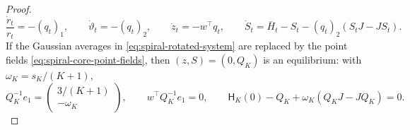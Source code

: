 \begin{proof}
\begin{equation}
        \frac{\dot r_t}{r_t}=-(q_t)_1,
        \qquad
        \dot\vartheta_t=-(q_t)_2,
        \qquad
        \dot z_t=-w^\top q_t,
        \qquad
        \dot S_t=\bar H_t-S_t-(q_t)_2(S_tJ-JS_t).
    \end{equation}
    If the Gaussian averages in \eqref{eq:spiral-rotated-system} are replaced by the point
    fields \eqref{eq:spiral-core-point-fields}, then $(z,S)=(0,Q_K)$ is an equilibrium: with
    $\omega_K=s_K/(K+1)$,
    \begin{equation*}
        Q_K^{-1}e_1=\begin{pmatrix}3/(K+1)\\-\omega_K\end{pmatrix},
        \qquad
        w^\top Q_K^{-1}e_1=0,
        \qquad
        \mathsf H_K(0)-Q_K+\omega_K(Q_KJ-JQ_K)=0 .
    \end{equation*}


\end{proof}
